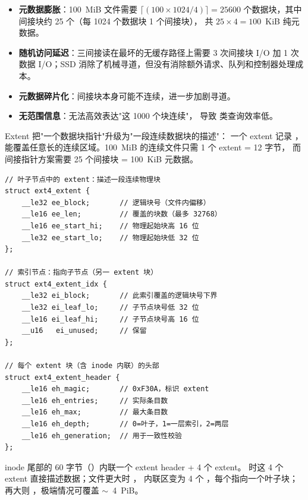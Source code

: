 \begin{filesystemlayout}

\begin{itemize}\tightlist
\item \textbf{元数据膨胀}：100~MiB 文件需要 $\lceil(100 \times 1024 / 4)\rceil = 25600$
  个数据块，其中间接块约 25 个（每 1024 个数据块 1 个间接块），
  共 $25 \times 4 = 100$~KiB 纯元数据。
\item \textbf{随机访问延迟}：三间接读在最坏的无缓存路径上需要 3 次间接块 I/O 加 1 次数据 I/O；SSD 消除了机械寻道，但没有消除额外请求、队列和控制器处理成本。
\item \textbf{元数据碎片化}：间接块本身可能不连续，进一步加剧寻道。
\item \textbf{无范围信息}：无法高效表达"这 1000 个块连续"，
  导致  类查询效率低。
\end{itemize}


\begin{keyidea}
Extent 把"一个数据块指针"升级为"一段连续数据块的描述"：
一个 extent 记录 ，
能覆盖任意长的连续区域。100~MiB 的连续文件只需 1 个 extent = 12 字节，
而间接指针方案需要 25 个间接块 = 100~KiB 元数据。
\end{keyidea}


\begin{lstlisting}
// 叶子节点中的 extent：描述一段连续物理块
struct ext4_extent {
    __le32 ee_block;       // 逻辑块号（文件内偏移）
    __le16 ee_len;         // 覆盖的块数（最多 32768）
    __le16 ee_start_hi;    // 物理起始块高 16 位
    __le32 ee_start_lo;    // 物理起始块低 32 位
};

// 索引节点：指向子节点（另一 extent 块）
struct ext4_extent_idx {
    __le32 ei_block;       // 此索引覆盖的逻辑块号下界
    __le32 ei_leaf_lo;     // 子节点块号低 32 位
    __le16 ei_leaf_hi;     // 子节点块号高 16 位
    __u16   ei_unused;     // 保留
};

// 每个 extent 块（含 inode 内联）的头部
struct ext4_extent_header {
    __le16 eh_magic;       // 0xF30A，标识 extent
    __le16 eh_entries;     // 实际条目数
    __le16 eh_max;         // 最大条目数
    __le16 eh_depth;       // 0=叶子，1=一层索引，2=两层
    __le16 eh_generation;  // 用于一致性校验
};
\end{lstlisting}

inode 尾部的 60 字节（）内联一个 extent header + 4 个 extent。
 时这 4 个 extent 直接描述数据；文件更大时 ，
内联区变为 4 个 ，每个指向一个叶子块；
再大则 ，极端情况可覆盖 $\sim$~4~PiB。


\end{filesystemlayout}
